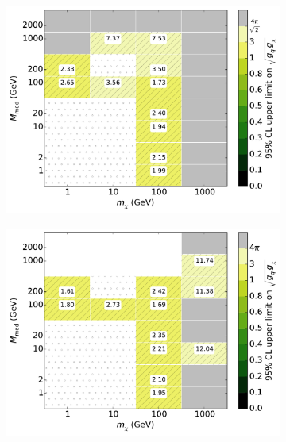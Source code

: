 \begin{figure}[h]
  \centering
    \begin{subfigure}[t]{0.495\textwidth}
      \centering
      \includegraphics[width=1.\textwidth]{figures/grid_basepoints_SVD_rat05_monoWZ.pdf}
      \caption{}
    \end{subfigure}
    \begin{subfigure}[t]{0.495\textwidth}
      \centering
      \includegraphics[width=1.\textwidth]{figures/grid_basepoints_SVD_rat1_monoWZ.pdf}
      \caption{}
    \end{subfigure}
    \begin{subfigure}[t]{0.495\textwidth}
      \centering

\end{subfigure}
\end{figure}

